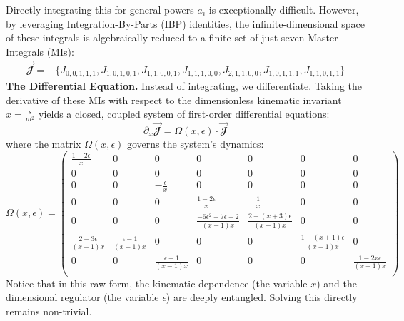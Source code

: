 Directly integrating this for general powers $a_i$ is exceptionally difficult. However, by leveraging Integration-By-Parts (IBP) identities, the infinite-dimensional space of these integrals is algebraically reduced to a finite set of just seven Master Integrals (MIs):
\begin{equation}
\begin{split}
    \vec{\mathbfcal{J}} = &\{J_{0,0,1,1,1}, J_{1,0,1,0,1}, J_{1,1,0,0,1}, J_{1,1,1,0,0}, J_{2,1,1,0,0}, J_{1,0,1,1,1}, J_{1,1,0,1,1}\}
    \end{split}
\end{equation}
\textbf{The Differential Equation.}
Instead of integrating, we differentiate. Taking the derivative of these MIs with respect to the dimensionless kinematic invariant $x = \frac{s}{m^2}$ yields a closed, coupled system of first-order differential equations:
\begin{equation}
    \partial_{x}\vec{\mathbfcal{J}} = \Omega(x,\epsilon)\cdot \vec{\mathbfcal{J}}
\end{equation}
where the matrix $\Omega(x,\epsilon)$ governs the system's dynamics:
\begin{equation}
\Omega(x,\epsilon) = \left(
\begin{array}{ccccccc}
 \frac{1-2 \epsilon }{x} & 0 & 0 & 0 & 0 & 0 & 0 \\
 0 & 0 & 0 & 0 & 0 & 0 & 0 \\
 0 & 0 & -\frac{\epsilon }{x} & 0 & 0 & 0 & 0 \\
 0 & 0 & 0 & \frac{1-2 \epsilon }{x} & -\frac{1}{x} & 0 & 0 \\
 0 & 0 & 0 & \frac{-6 \epsilon ^2+7 \epsilon -2}{(x-1) x} & \frac{2-(x+3) \epsilon }{(x-1) x} & 0 & 0 \\
 \frac{2-3 \epsilon }{(x-1) x} & \frac{\epsilon -1}{(x-1) x} & 0 & 0 & 0 & \frac{1-(x+1) \epsilon }{(x-1) x} & 0 \\
 0 & 0 & \frac{\epsilon -1}{(x-1) x} & 0 & 0 & 0 & \frac{1-2 x \epsilon }{(x-1) x} \\
\end{array}
\right)
\end{equation}
Notice that in this raw form, the kinematic dependence (the variable $x$) and the dimensional regulator (the variable $\epsilon$) are deeply entangled. Solving this directly remains non-trivial.

